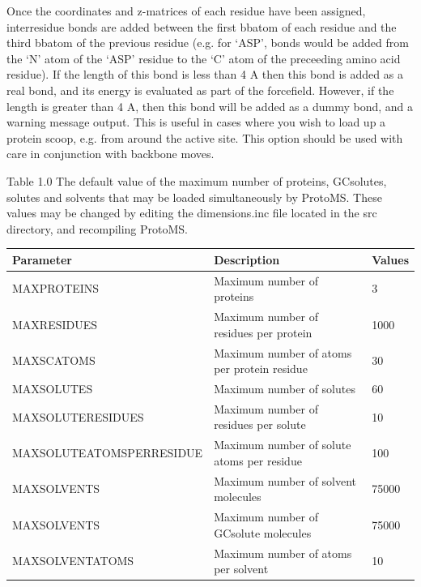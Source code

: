 \documentclass[letterpaper,10pt,english]{manual}
\begin{document}
Once the coordinates and z-matrices of each residue have been assigned, interresidue bonds are added between the first bbatom of each residue and the third bbatom of the previous residue (e.g. for ‘ASP’, bonds would be added from the ‘N’ atom of the ‘ASP’ residue to the ‘C’ atom of the preceeding amino acid residue). If the length of this bond is less than 4 A then this bond is added as a real bond, and its energy is evaluated as part of the forcefield. However, if the length is greater than 4 A, then this bond will be added as a dummy bond, and a warning message output. This is useful in cases where you wish to load up a protein scoop, e.g. from around the active site. This option should be used with care in conjunction with backbone moves.

\begin{threeparttable}
\caption{Table 1.0 The default value of the maximum number of proteins, GCsolutes, solutes and solvents that may be loaded simultaneously by ProtoMS. These values may be changed by editing the dimensions.inc file located in the src directory, and recompiling ProtoMS.}

\begin{tabulary}{\textwidth}{|L|L|L|}
\hline
\textbf{
Parameter
} & \textbf{
Description
} & \textbf{
Values
}\\
\hline

MAXPROTEINS
 & 
Maximum number of proteins
 & 
3
\\

MAXRESIDUES
 & 
Maximum number of residues per protein
 & 
1000
\\

MAXSCATOMS
 & 
Maximum number of atoms per protein residue
 & 
30
\\

MAXSOLUTES
 & 
Maximum number of solutes
 & 
60
\\

MAXSOLUTERESIDUES
 & 
Maximum number of residues per solute
 & 
10
\\

MAXSOLUTEATOMSPERRESIDUE
 & 
Maximum number of solute atoms per residue
 & 
100
\\

MAXSOLVENTS
 & 
Maximum number of solvent molecules
 & 
75000
\\

MAXSOLVENTS
 & 
Maximum number of GCsolute molecules
 & 
75000
\\

MAXSOLVENTATOMS
 & 
Maximum number of atoms per solvent
 & 
10
\\
\hline
\end{tabulary}

\end{threeparttable}
\end{document}
